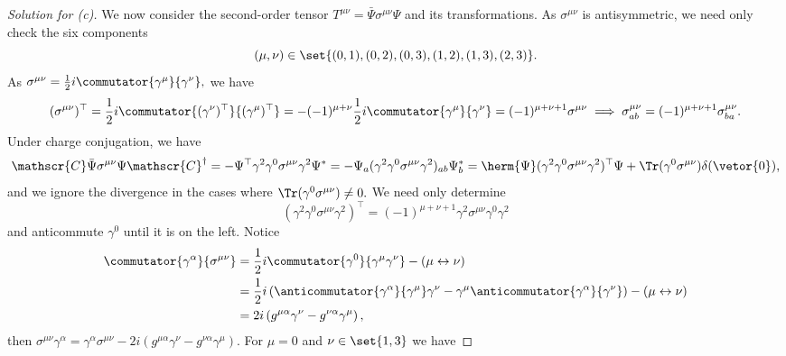 \begin{proof}[Solution for (c)]
   We now consider the second-order tensor \(T^{\mu\nu} = \bar{\Psi} \sigma^{\mu\nu} \Psi\) and its transformations. As \(\sigma^{\mu\nu}\) is antisymmetric, we need only check the six components
   \begin{equation*}
      (\mu, \nu) \in \set{(0,1), (0,2), (0,3), (1,2), (1,3), (2,3)}.
   \end{equation*}
   As \(\sigma^{\mu\nu} = \frac12 i \commutator{\gamma^\mu}{\gamma^\nu},\) we have 
   \begin{equation*}
      (\sigma^{\mu\nu})^\top = \frac12 i \commutator{(\gamma^\nu)^\top}{(\gamma^\mu)^\top} = - (-1)^{\mu+\nu}\frac12i\commutator{\gamma^\mu}{\gamma^\nu} = (-1)^{\mu+\nu+1} \sigma^{\mu\nu} \implies \sigma^{\mu\nu}_{ab} = (-1)^{\mu + \nu + 1} \sigma^{\mu\nu}_{ba}.
   \end{equation*}
   Under charge conjugation, we have
   \begin{equation*}
      \mathscr{C} \bar{\Psi} \sigma^{\mu\nu} \Psi \mathscr{C}^\dag = - \Psi^\top \gamma^2 \gamma^0 \sigma^{\mu\nu} \gamma^2 \Psi^* = - \Psi_a (\gamma^2 \gamma^0 \sigma^{\mu\nu} \gamma^2)_{ab} \Psi^*_b = \herm{\Psi} (\gamma^2 \gamma^0 \sigma^{\mu\nu} \gamma^2)^\top \Psi + \Tr(\gamma^0 \sigma^{\mu\nu}) \delta(\vetor{0}),
   \end{equation*}
   and we ignore the divergence in the cases where \(\Tr(\gamma^0 \sigma^{\mu\nu}) \neq 0.\) We need only determine 
   \begin{equation*}
      (\gamma^2 \gamma^0 \sigma^{\mu\nu} \gamma^2)^\top = (-1)^{\mu+\nu+1} \gamma^2 \sigma^{\mu\nu} \gamma^0 \gamma^2
   \end{equation*}
   and anticommute \(\gamma^0\) until it is on the left. Notice
   \begin{align*}
      \commutator{\gamma^\alpha}{\sigma^{\mu\nu}} &= \frac12 i\commutator{\gamma^0}{\gamma^\mu \gamma^\nu} - (\mu \leftrightarrow \nu)\\
                                                  &=  \frac12 i \left(\anticommutator{\gamma^\alpha}{\gamma^\mu}\gamma^\nu - \gamma^\mu \anticommutator{\gamma^\alpha}{\gamma^\nu}\right) - (\mu \leftrightarrow \nu)\\
                                                  &= 2i \left(g^{\mu \alpha} \gamma^\nu - g^{\nu \alpha} \gamma^\mu\right),
   \end{align*}
   then \(\sigma^{\mu\nu} \gamma^\alpha = \gamma^\alpha \sigma^{\mu\nu} - 2i\left(g^{\mu \alpha} \gamma^\nu - g^{\nu \alpha} \gamma^\mu\right)\). For \(\mu = 0\) and \(\nu \in \set{1,3}\) we have

\end{proof}
